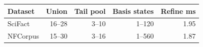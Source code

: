 \begin{tabular}{lrrrr}
\toprule
Dataset & Union & Tail pool & Basis states & Refine ms\\
\midrule
SciFact & 16--28 & 3--10 & 1--120 & 1.95\\
NFCorpus & 15--30 & 3--16 & 1--560 & 1.87\\
\bottomrule
\end{tabular}

